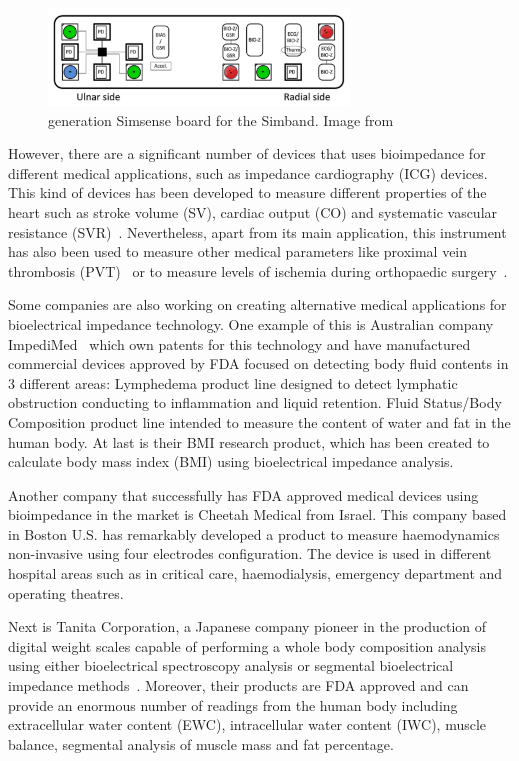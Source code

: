 \begin{figure}[!htpb]
	\centering
	\includegraphics[width=8cm,keepaspectratio]{figure10}    
	\caption[ generation Simsense board for the Simband]{ generation Simsense board for the Simband. Image from \cite{simsense}}
	\label{fig:simsense}
\end{figure}

However, there are a significant number of devices that uses bioimpedance for different medical applications, such as impedance cardiography (ICG) devices. This kind of devices has been developed to measure different properties of the heart such as stroke volume (SV), cardiac output (CO) and systematic vascular resistance (SVR)~\cite{neath2005utility}.  Nevertheless, apart from its main application, this instrument has also been used to measure other medical parameters like proximal vein thrombosis (PVT)~\cite{hull1978impedance} or to measure levels of ischemia during orthopaedic surgery~\cite{distefano1973bioelectrical}.

Some companies are also working on creating alternative medical applications for bioelectrical impedance technology. One example of this is Australian company ImpediMed~\cite{impedimed} which own patents for this technology and have manufactured commercial devices approved by FDA focused on detecting body fluid contents in 3 different areas: Lymphedema product line designed to detect lymphatic obstruction conducting to inflammation and liquid retention.  Fluid Status/Body Composition product line intended to measure the content of water and fat in the human body. At last is their BMI research product, which has been created to calculate body mass index (BMI) using bioelectrical impedance analysis.

Another company that successfully has FDA approved medical devices using bioimpedance in the market is Cheetah Medical \cite{cheetah} from Israel. This company based in Boston U.S. has remarkably developed a product to measure haemodynamics non-invasive using four electrodes configuration. The device is used in different hospital areas such as in critical care, haemodialysis, emergency department and operating theatres.

Next is Tanita Corporation, a Japanese company pioneer in the production of digital weight scales capable of performing a whole body composition analysis using either bioelectrical spectroscopy analysis or segmental bioelectrical impedance methods~\cite{tanita}. Moreover, their products are FDA approved and can provide an enormous number of readings from the human body including extracellular water content (EWC), intracellular water content (IWC), muscle balance, segmental analysis of muscle mass and fat percentage.

